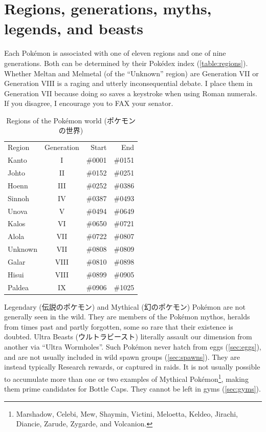 \section{Regions, generations, myths, legends, and beasts}
\label{sec:regions}
Each Pokémon is associated with one of eleven regions and one of nine generations.
Both can be determined by their Pokédex index (\autoref{table:regions}).
Whether Meltan and Melmetal (of the ``Unknown'' region) are Generation VII
  or Generation VIII is a raging and utterly inconsequential debate.
I place them in Generation VII because doing so saves a keystroke when using Roman numerals.
If you disagree, I encourage you to FAX your senator.
\begin{table}
\centering
\begin{tabular}{lcrr}
  Region & Generation & Start & End\\
  \Midrule
  Kanto & I & \#0001 & \#0151\\
  Johto & II & \#0152 & \#0251\\
  Hoenn & III & \#0252 & \#0386\\
  Sinnoh & IV & \#0387 & \#0493\\
  Unova & V & \#0494 & \#0649\\
  Kalos & VI & \#0650 & \#0721\\
  Alola & VII & \#0722 & \#0807\\
  Unknown & VII & \#0808 & \#0809\\
  Galar & VIII & \#0810 & \#0898\\
  Hisui & VIII & \#0899 & \#0905\\
  Paldea & IX & \#0906 & \#1025\\
\end{tabular}
\caption[Regions of the Pokémon world]{Regions of the Pokémon world (\textjapanese{ポケモンの世界})}
\label{table:regions}
\end{table}
\label{sec:myths}
Legendary (\textjapanese{伝説のポケモン}) and Mythical (\textjapanese{幻のポケモン}) Pokémon
 are not generally seen in the wild.
They are members of the Pokémon mythos, heralds from times past and partly forgotten,
  some so rare that their existence is doubted.
Ultra Beasts (\textjapanese{ウルトラビースト}) literally assault our dimension from
  another via ``Ultra Wormholes''.
Such Pokémon never hatch from eggs (\autoref{sec:eggs}), and are not usually included in wild spawn groups (\autoref{sec:spawns}).
They are instead typically Research rewards, or captured in raids.
It is not usually possible to accumulate more than one or two examples of Mythical
  Pokémon\footnote{Marshadow, Celebi, Mew, Shaymin, Victini, Meloetta, Keldeo,
  Jirachi, Diancie, Zarude, Zygarde, and Volcanion.}, making them prime
  candidates for Bottle Caps.
They cannot be left in gyms (\autoref{sec:gyms}).

